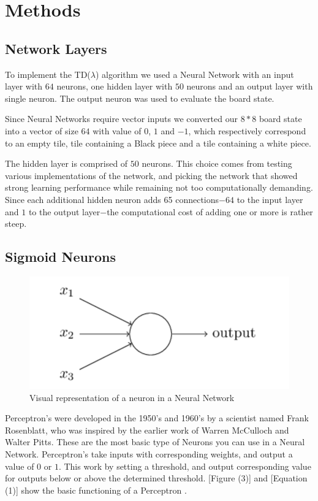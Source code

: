 \documentclass{sig-alternate-05-2015}
\begin{document}
\section{Methods}

\subsection{Network Layers}
 
To implement the TD(\(\lambda\)) algorithm we used a Neural Network with an input layer with $64$ neurons, one hidden layer with $50$ neurons and an output layer with single neuron. The output neuron was used to evaluate the board state.

Since Neural Networks require vector inputs we converted our $8*8$ board state into a vector of size $64$ with value of $0$, $1$ and $-1$, which respectively correspond to an empty tile, tile containing a Black piece and a tile containing a white piece.

The hidden layer is comprised of $50$ neurons. This choice comes from testing various implementations of the network, and picking the network that showed strong learning performance while remaining not too computationally demanding. Since each additional hidden neuron adds 65 connections$-$$64$ to the input layer and $1$ to the output layer$-$the computational cost of adding one or more is rather steep.
 
\subsection{Sigmoid Neurons}
\begin{figure}[h!]
  \includegraphics[width=\linewidth]{neuron.png}
  \caption{Visual representation of a neuron in a Neural Network}
  \label{fig:neuron4}
\end{figure}
 
        	Perceptron's were developed in the 1950's and 1960's by a scientist named Frank Rosenblatt, who was inspired by the earlier work of Warren McCulloch and Walter Pitts. These are the most basic type of Neurons you can use in a Neural Network. Perceptron's take inputs with corresponding weights, and output a value of $0$ or $1$. This work by setting a threshold, and output corresponding value for outputs below or above the determined threshold. [Figure (3)] and [Equation (1)] show the basic functioning of a Perceptron \cite{rosenblatt1958perceptron}.
\end{document}
